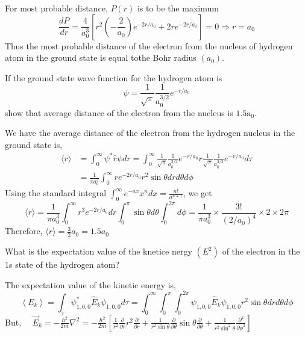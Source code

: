 \begin{enumerate}
\begin{answer}
		For most probable distance, $P(r)$ is to be the maximum
		$$
		\frac{d P}{d r}=\frac{4}{a_{0}^{3}}\left[r^{2}\left(-\frac{2}{a_{0}}\right) e^{-2 r / a_{0}}+2 r e^{-2 r / a_{0}}\right]=0 \Rightarrow r=a_{0}
		$$
		Thus the most probable distance of the electron from the nucleus of hydrogen atom in the ground state is equal tothe Bohr radius $\left(a_{0}\right)$.	
	\end{answer}
		\begin{minipage}{\textwidth}
		\item If the ground state wave function for the hydrogen atom is
		$$
		\psi=\frac{1}{\sqrt{\pi}} \frac{1}{a_{0}^{3 / 2}} e^{-r / a_{0}}
		$$
		show that average distance of the electron from the nucleus is $1.5 \mathrm{a}_{0}$.
	\end{minipage}
	\begin{answer}
		We have the average distance of the electron from the hydrogen nucleus in the ground state is,
		$$
		\begin{aligned}
		\langle r\rangle &=\int_{0}^{\infty} \psi^{*} \hat{r} \psi d r=\int_{0}^{\infty} \frac{1}{\sqrt{\pi}} \frac{1}{a_{0}^{3 / 2}} e^{-r / a_{0}} r \frac{1}{\sqrt{\pi}} \frac{1}{a_{0}^{3 / 2}} e^{-r / a_{0}} d \tau \\
		&=\frac{1}{\pi a_{0}^{3}} \int_{0}^{\infty} r e^{-2 r / a_{0}} r^{2} \sin \theta d r d \theta d \phi
		\end{aligned}
		$$
		Using the standard integral $\int_{0}^{\infty} e^{-a x} x^{n} d x=\frac{n !}{a^{n+1}}$, we get
		$$
		\langle r\rangle=\frac{1}{\pi a_{0}^{3}} \int_{0}^{\infty} r^{3} e^{-2 r / a_{0}} d r \int_{0}^{\pi} \sin \theta d \theta \int_{0}^{2 \pi} d \phi=\frac{1}{\pi a_{0}^{3}} \times \frac{3 !}{\left(2 / a_{0}\right)^{4}} \times 2 \times 2 \pi
		$$
		Therefore, $\langle r\rangle=\frac{3}{2} a_{0}=1.5 a_{0}$
	\end{answer}
		\begin{minipage}{\textwidth}
		\item What is the expectation value of the knetice nergy $\left(E^{2}\right)$ of the electron in the 1s state of the hydrogen atom?
	\end{minipage}
	\begin{answer}
		The expectation value of the kinetic energy is,
		$$
		\left\langle E_{k}\right\rangle=\int_{\tau} \psi_{1,0,0}^{*} \hat{E}_{k} \psi_{1,0,0} d \tau=\int_{0}^{\infty} \int_{0}^{\pi} \int_{0}^{2 \pi} \psi_{1,0,0} \hat{E}_{k} \psi_{1,0,0} r^{2} \sin \theta d r d \theta d \phi
		$$
		But, $\quad \vec{E}_{k}=-\frac{\hbar^{2}}{2 m} \nabla^{2}=-\frac{\hbar^{2}}{2 m}\left[\frac{1}{r^{2}} \frac{\partial}{\partial r} r^{2} \frac{\partial}{\partial r}+\frac{1}{r^{2} \sin \theta} \frac{\partial}{\partial \theta} \sin \theta \frac{\partial}{\partial \theta}+\frac{1}{r^{2} \sin ^{2} \theta} \frac{\partial^{2}}{\partial \phi^{2}}\right]$\\

\end{answer}
\end{enumerate}
